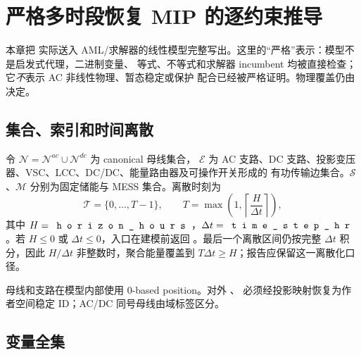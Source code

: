 \section{严格多时段恢复 MIP 的逐约束推导}\label{sec:res-strict-derivation}

本章把 
实际送入 AML/求解器的线性模型完整写出。这里的“严格”表示：模型不是启发式代理，二进制变量、
等式、不等式和求解器 incumbent 均被直接检查；它\emph{不}表示 AC 非线性物理、暂态稳定或保护
配合已经被严格证明。物理覆盖仍由  决定。

\subsection{集合、索引和时间离散}

令 $\mathcal N=\mathcal N^{ac}\cup\mathcal N^{dc}$ 为 canonical 母线集合，
$\mathcal E$ 为 AC 支路、DC 支路、投影变压器、VSC、LCC、DC/DC、能量路由器及可操作开关形成的
有功传输边集合。$\mathcal S$、$\mathcal M$ 分别为固定储能与 MESS 集合。离散时刻为
\begin{equation}
 \mathcal T=\{0,\ldots,T-1\},\qquad
 T=\max\!\left(1,\left\lceil\frac{H}{\Delta t}\right\rceil\right),
\end{equation}
其中 $H=\fld{horizon\_hours}$，$\Delta t=\fld{time\_step\_hr}$。若 $H\le0$ 或
$\Delta t\le0$，入口在建模前返回 。最后一个离散区间仍按完整 $\Delta t$
积分，因此 $H/\Delta t$ 非整数时，聚合能量覆盖到 $T\Delta t\ge H$；报告应保留这一离散化口径。

母线和支路在模型内部使用 0-based position。对外 、
 必须经投影映射恢复为作者空间稳定 ID；AC/DC 同号母线由域标签区分。

\subsection{变量全集}

